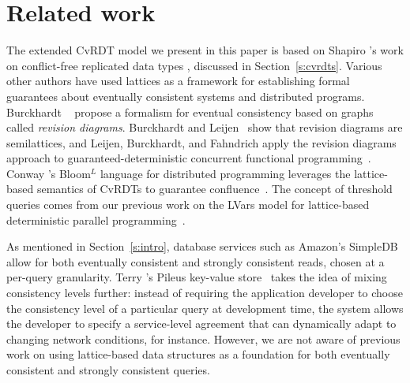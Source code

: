 \section{Related work}

The extended CvRDT model we present in this paper is based on Shapiro
\etal's work on conflict-free replicated data types
\cite{crdts,crdts-tr}, discussed in Section~\ref{s:cvrdts}.  Various
other authors
\cite{eventually-consistent-transactions,semantics-concurrent-revisions,blooml}
have used lattices as a framework for establishing formal guarantees
about eventually consistent systems and distributed programs.
Burckhardt \etal~\cite{eventually-consistent-transactions} propose a
formalism for eventual consistency based on graphs called
\emph{revision diagrams}.  Burckhardt and
Leijen~\cite{semantics-concurrent-revisions} show that revision
diagrams are semilattices, and Leijen, Burckhardt, and Fahndrich apply
the revision diagrams approach to guaranteed-deterministic concurrent
functional programming~\cite{concurrent-revisions-haskell11}. Conway
\etal's Bloom$^L$ language for distributed programming leverages the
lattice-based semantics of CvRDTs to guarantee
confluence~\cite{blooml}.  The concept of threshold queries 
comes from our previous work on the LVars model for
lattice-based deterministic parallel
programming~\cite{LVars-paper,Freeze-paper,effectzoo}.

As mentioned in Section~\ref{s:intro}, database services such as
Amazon's SimpleDB~\cite{simpledb-vogels-article} allow for both
eventually consistent and strongly consistent reads, chosen at a
per-query granularity.  Terry \etal's Pileus key-value
store~\cite{pileus} takes the idea of mixing consistency levels
further: instead of requiring the application developer to choose the
consistency level of a particular query at development time, the
system allows the developer to specify a service-level agreement that
can dynamically adapt to changing network conditions, for instance.
However, we are not aware of previous work on using
lattice-based data structures as a foundation for both eventually
consistent and strongly consistent queries.

